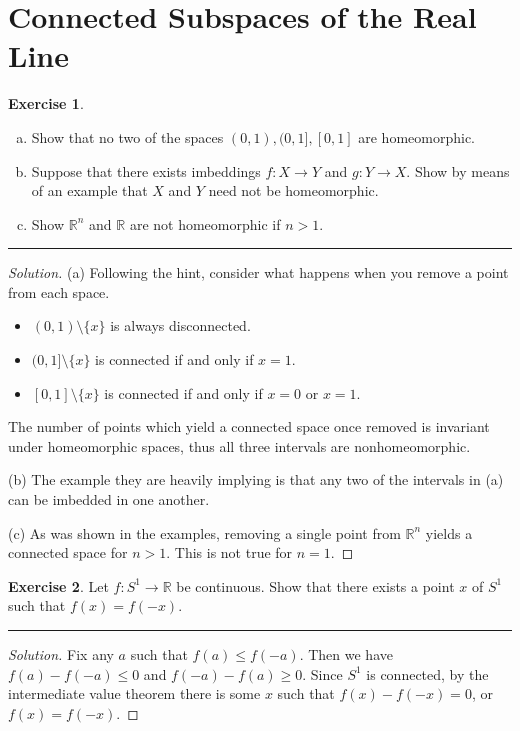 \documentclass{article}
\theoremstyle{definition}
\newtheorem{exercise}{Exercise}[section]
\begin{document}
\addtocounter{section}{23}
\section{Connected Subspaces of the Real Line}

\begin{exercise}
  \begin{enumerate}[(a)]
    \item Show that no two of the spaces $(0,1),(0,1],[0,1]$ are homeomorphic.
    \item Suppose that there exists imbeddings $f:X\to Y$ and $g:Y\to X$. Show by means of an example that $X$ and $Y$ need not be homeomorphic.
    \item Show $\mathbb{R}^n$ and $\mathbb{R}$ are not homeomorphic if $n > 1$.
  \end{enumerate}
\end{exercise}
\hrule
\begin{proof}[Solution]
  (a) Following the hint, consider what happens when you remove a point from each space.
  \begin{itemize}
    \item $(0,1)\setminus\{x\}$ is always disconnected.
    \item $(0,1]\setminus\{x\}$ is connected if and only if $x = 1$.
    \item $[0,1]\setminus\{x\}$ is connected if and only if $x = 0$ or $x = 1$.
  \end{itemize}
  The number of points which yield a connected space once removed is invariant under homeomorphic spaces, thus all three intervals are nonhomeomorphic.

  (b) The example they are heavily implying is that any two of the intervals in (a) can be imbedded in one another.

  (c) As was shown in the examples, removing a single point from $\mathbb{R}^n$ yields a connected space for $n > 1$. This is not true for $n = 1$.
\end{proof}

\pagebreak

\begin{exercise}
  Let $f:S^1\to\mathbb{R}$ be continuous. Show that there exists a point $x$ of $S^1$ such that $f(x) = f(-x)$.
\end{exercise}
\hrule
\begin{proof}[Solution]
  Fix any $a$ such that $f(a) \le f(-a)$. Then we have $f(a) - f(-a) \le 0$ and $f(-a) - f(a) \ge 0$. Since $S^1$ is connected, by the intermediate value theorem there is some $x$ such that $f(x) - f(-x) = 0$, or $f(x) = f(-x)$.
\end{proof}
\end{document}

